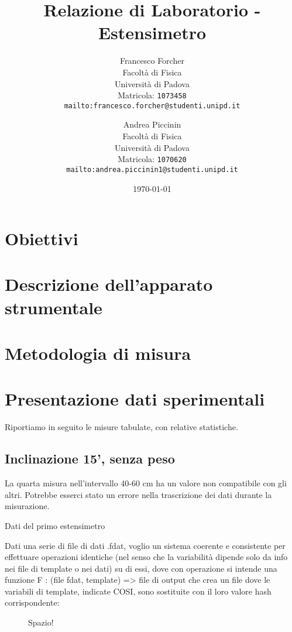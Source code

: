 \documentclass[12pt]{article} %
\title {Relazione di Laboratorio - Estensimetro}
\author{Francesco Forcher\\
Facoltà di Fisica\\
Università di Padova\\
Matricola: \texttt{1073458}\\
\texttt{mailto:francesco.forcher@studenti.unipd.it}\\
\and
Andrea Piccinin\\
Facoltà di Fisica\\
Università di Padova\\
Matricola: \texttt{1070620}\\
\texttt{mailto:andrea.piccinin1@studenti.unipd.it}\\
}
\date{\today}
\begin{document}
\maketitle %
\tableofcontents %



        

\section{Obiettivi}

\section{Descrizione dell'apparato strumentale}

\section{Metodologia di misura}

\section{Presentazione dati sperimentali}	
Riportiamo in seguito le misure tabulate, con relative statistiche.

\subsection {Inclinazione 15', senza peso}
La quarta misura nell'intervallo 40-60 cm ha un valore non compatibile con gli altri. Potrebbe esserci stato un errore nella trascrizione dei dati durante la misurazione.
\begin{grafico}
    \centering

\caption{Dati del primo estensimetro}
\label{fig:spazio1}
\end{grafico}
Dati una serie di file di dati .fdat, voglio un sistema coerente e consistente per effettuare operazioni
identiche (nel senso che la variabilità dipende solo da info nei file di template o nei dati) su di essi, dove
con operazione si intende una funzione F : (file fdat, template) => file di output che crea un file dove
le variabili di template, indicate COSI, sono sostituite con il loro valore hash corrispondente:


\begin{figure}[H]
    \centering

\caption{Spazio!}
\label{fig:spazio1}
\end{figure}
\end{document}
